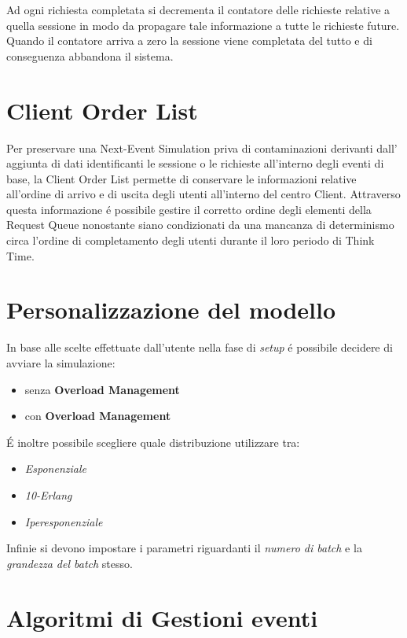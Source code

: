 Ad ogni richiesta completata si decrementa il contatore delle richieste relative 
a quella sessione in modo da propagare tale informazione a tutte le richieste 
future. Quando il contatore arriva a zero la sessione viene completata del tutto 
e di conseguenza abbandona il sistema.

\section{Client Order List}
Per preservare una Next-Event Simulation priva di contaminazioni derivanti dall'
aggiunta di dati identificanti le sessione o le richieste all'interno degli eventi di base, 
la Client Order List permette di conservare le 
informazioni relative all'ordine di arrivo e di uscita degli utenti all'interno 
del centro Client. Attraverso questa informazione \'e possibile gestire il 
corretto ordine degli elementi della Request Queue nonostante siano condizionati 
da una mancanza di determinismo circa l'ordine di completamento degli utenti 
durante il loro periodo di Think Time.


\section{Personalizzazione del modello}
In base alle scelte effettuate dall'utente nella fase di \textit{setup} \'e 
possibile decidere di avviare la simulazione:
\begin{itemize}
\item senza \textbf{Overload Management}
\item con \textbf{Overload Management}
\end{itemize}
 
\noindent \'E inoltre possibile scegliere quale distribuzione utilizzare tra:
\begin{itemize}
\item \textit{Esponenziale}
\item \textit{10-Erlang}
\item \textit{Iperesponenziale}
\end{itemize}

\noindent Infinie si devono impostare i parametri riguardanti il \textit{numero di batch}
e la \textit{grandezza del batch} stesso.

\section{Algoritmi di Gestioni eventi}
